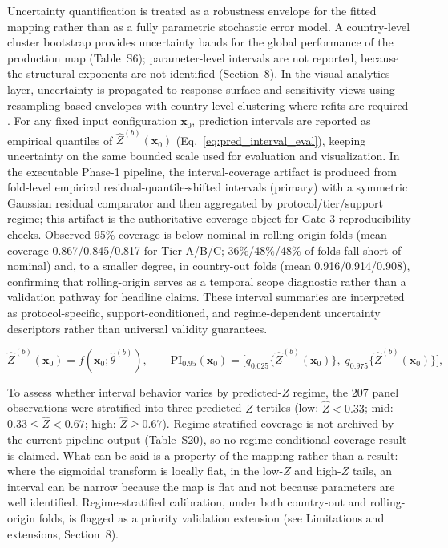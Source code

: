 \documentclass[11pt]{article}
\begin{document}
Uncertainty quantification is treated as a robustness envelope for the fitted mapping rather than as a fully parametric stochastic error model. A country-level cluster bootstrap provides uncertainty bands for the global performance of the production map \parencite{EfronTibshirani1993Bootstrap, DavisonHinkley1997Bootstrap} (Table~S6); parameter-level intervals are not reported, because the structural exponents are not identified (Section~8). In the visual analytics layer, uncertainty is propagated to response-surface and sensitivity views using resampling-based envelopes with country-level clustering where refits are required \parencite{cameron2015practitioner}. For any fixed input configuration $\mathbf{x}_0$, prediction intervals are reported as empirical quantiles of $\widehat{Z}^{(b)}(\mathbf{x}_0)$ (Eq.~\eqref{eq:pred_interval_eval}), keeping uncertainty on the same bounded scale used for evaluation and visualization. In the executable Phase-1 pipeline, the interval-coverage artifact is produced from fold-level empirical residual-quantile-shifted intervals (primary) with a symmetric Gaussian residual comparator and then aggregated by protocol/tier/support regime; this artifact is the authoritative coverage object for Gate-3 reproducibility checks. Observed 95\% coverage is below nominal in rolling-origin folds (mean coverage 0.867/0.845/0.817 for Tier A/B/C; 36\%/48\%/48\% of folds fall short of nominal) and, to a smaller degree, in country-out folds (mean 0.916/0.914/0.908), confirming that rolling-origin serves as a temporal scope diagnostic rather than a validation pathway for headline claims. These interval summaries are interpreted as protocol-specific, support-conditioned, and regime-dependent uncertainty descriptors rather than universal validity guarantees.

\begin{equation}
\label{eq:pred_interval_eval}
\widehat{Z}^{(b)}(\mathbf{x}_0)=f(\mathbf{x}_0;\widehat{\theta}^{(b)}),\qquad
\mathrm{PI}_{0.95}(\mathbf{x}_0)=\bigl[q_{0.025}\{\widehat{Z}^{(b)}(\mathbf{x}_0)\},\;q_{0.975}\{\widehat{Z}^{(b)}(\mathbf{x}_0)\}\bigr],
\end{equation}

To assess whether interval behavior varies by predicted-$Z$ regime, the 207 panel observations were stratified into three predicted-$Z$ tertiles (low: $\hat{Z}<0.33$; mid: $0.33\le\hat{Z}<0.67$; high: $\hat{Z}\ge 0.67$). Regime-stratified coverage is not archived by the current pipeline output (Table~S20), so no regime-conditional coverage result is claimed. What can be said is a property of the mapping rather than a result: where the sigmoidal transform is locally flat, in the low-$Z$ and high-$Z$ tails, an interval can be narrow because the map is flat and not because parameters are well identified. Regime-stratified calibration, under both country-out and rolling-origin folds, is flagged as a priority validation extension (see Limitations and extensions, Section~8).
\end{document}
